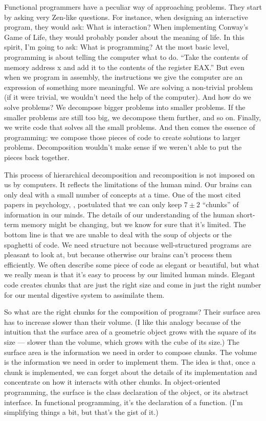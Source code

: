 Functional programmers have a peculiar way of approaching problems. They
start by asking very Zen-like questions. For instance, when designing an
interactive program, they would ask: What is interaction? When
implementing Conway's Game of Life, they would probably ponder about the
meaning of life. In this spirit, I'm going to ask: What is programming?
At the most basic level, programming is about telling the computer what
to do. ``Take the contents of memory address x and add it to the
contents of the register EAX.'' But even when we program in assembly,
the instructions we give the computer are an expression of something
more meaningful. We are solving a non-trivial problem (if it were
trivial, we wouldn't need the help of the computer). And how do we solve
problems? We decompose bigger problems into smaller problems. If the
smaller problems are still too big, we decompose them further, and so
on. Finally, we write code that solves all the small problems. And then
comes the essence of programming: we compose those pieces of code to
create solutions to larger problems. Decomposition wouldn't make sense
if we weren't able to put the pieces back together.

This process of hierarchical decomposition and recomposition is not
imposed on us by computers. It reflects the limitations of the human
mind. Our brains can only deal with a small number of concepts at a
time. One of the most cited papers in psychology,
, postulated that we can only
keep $7 \pm 2$ ``chunks'' of information in our minds. The details of our
understanding of the human short-term memory might be changing, but we
know for sure that it's limited. The bottom line is that we are unable
to deal with the soup of objects or the spaghetti of code. We need
structure not because well-structured programs are pleasant to look at,
but because otherwise our brains can't process them efficiently. We
often describe some piece of code as elegant or beautiful, but what we
really mean is that it's easy to process by our limited human minds.
Elegant code creates chunks that are just the right size and come in
just the right number for our mental digestive system to assimilate
them.

So what are the right chunks for the composition of programs? Their
surface area has to increase slower than their volume. (I like this
analogy because of the intuition that the surface area of a geometric
object grows with the square of its size --- slower than the volume,
which grows with the cube of its size.) The surface area is the
information we need in order to compose chunks. The volume is the
information we need in order to implement them. The idea is that, once a
chunk is implemented, we can forget about the details of its
implementation and concentrate on how it interacts with other chunks. In
object-oriented programming, the surface is the class declaration of the
object, or its abstract interface. In functional programming, it's the
declaration of a function. (I'm simplifying things a bit, but that's the
gist of it.)

